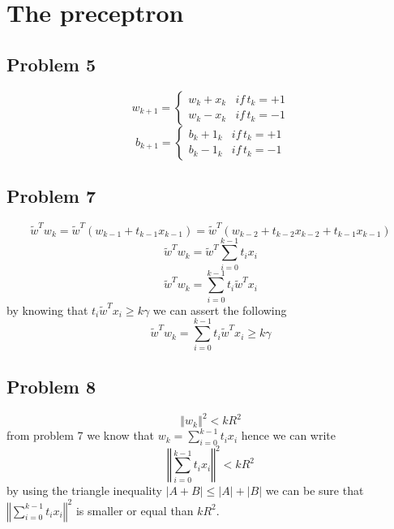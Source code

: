 \section{The preceptron}

\subsection*{Problem 5}
\[
w_{k+1}=\begin{cases}
w_{k}+x_{k} & if\, t_{k}=+1\\
w_{k}-x_{k} & if\, t_{k}=-1
\end{cases}
\]
\[
b_{k+1}=\begin{cases}
b_{k}+1_{k} & if\, t_{k}=+1\\
b_{k}-1_{k} & if\, t_{k}=-1
\end{cases}
\]


\subsection*{Problem 7}
\[
\tilde{w}^{T}w_{k}=\tilde{w}^{T}\left(w_{k-1}+t_{k-1}x_{k-1}\right)=\tilde{w}^{T}\left(w_{k-2}+t_{k-2}x_{k-2}+t_{k-1}x_{k-1}\right)
\]
\[
\tilde{w}^{T}w_{k}=\tilde{w}^{T}\sum_{i=0}^{k-1}t_{i}x_{i}
\]
\[
\tilde{w}^{T}w_{k}=\sum_{i=0}^{k-1}t_{i}\tilde{w}^{T}x_{i}
\]
by knowing that $t_{i}\tilde{w}^{T}x_{i}\geq k\gamma$ we can assert
the following
\[
\tilde{w}^{T}w_{k}=\sum_{i=0}^{k-1}t_{i}\tilde{w}^{T}x_{i}\geq k\gamma
\]


\subsection*{Problem 8}
\[
\left\Vert w_{k}\right\Vert ^{2}<kR^{2}
\]
from problem 7 we know that $w_{k}=\sum_{i=0}^{k-1}t_{i}x_{i}$ hence
we can write 
\[
\left\Vert \sum_{i=0}^{k-1}t_{i}x_{i}\right\Vert ^{2}<kR^{2}
\]
by using the triangle inequality
$\left|A+B\right|\leq\left|A\right|+\left|B\right|$
we can be sure that $\left\Vert \sum_{i=0}^{k-1}t_{i}x_{i}\right\Vert ^{2}$
is smaller or equal than $kR^{2}$.



